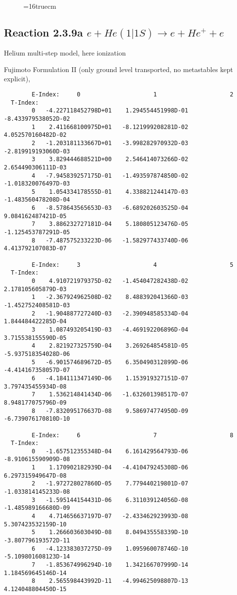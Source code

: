 \documentclass[12pt]{article}
\begin{document}
\begin{figure} \label{2.2.14}
\epsfxsize=16truecm
\end{figure}
\newpage




\subsection{
Reaction 2.3.9a  $e + He(1|1S) \rightarrow  e + He^+ + e $
}
Helium multi-step model, here ionization

 Fujimoto Formulation II (only ground level transported, no metastables
 kept explicit), \cite{kn:Fujimoto}



\begin{small}\begin{verbatim}
        E-Index:     0                     1                     2
  T-Index:
        0   -4.227118452798D+01    1.294554451998D-01   -8.433979538052D-02
        1    2.411668100975D+01   -8.121999208281D-02    4.052570160482D-02
        2   -1.203181133667D+01   -3.998282970932D-03   -2.819919193060D-03
        3    3.829444688521D+00    2.546414073266D-02    2.654490306111D-03
        4   -7.945839257175D-01   -1.493597874850D-02   -1.018320076497D-03
        5    1.054334178555D-01    4.338821244147D-03   -1.483560478208D-04
        6   -8.578643565653D-03   -6.689202603525D-04    9.084162487421D-05
        7    3.886232727181D-04    5.180805123476D-05   -1.125453787291D-05
        8   -7.487575233223D-06   -1.582977433740D-06    4.413792107083D-07

        E-Index:     3                     4                     5
  T-Index:
        0    4.910721979375D-02   -1.454047282438D-02    2.178105605879D-03
        1   -2.367924962508D-02    8.488392041366D-03   -1.452752408581D-03
        2   -1.904887727240D-03   -2.390948585334D-04    1.844484422285D-04
        3    1.087493205419D-03   -4.469192206896D-04    3.715538155590D-05
        4    2.821927325759D-04    3.269264854581D-05   -5.937518354028D-06
        5   -6.901574689672D-05    6.350490312899D-06   -4.414167358057D-07
        6   -4.184111347149D-06    1.153919327151D-07    3.797435455934D-08
        7    1.536214841434D-06   -1.632601398517D-07    8.948177075796D-09
        8   -7.832095176637D-08    9.586974774950D-09   -6.739076170810D-10

        E-Index:     6                     7                     8
  T-Index:
        0   -1.657512355348D-04    6.161429564793D-06   -8.910615590909D-08
        1    1.170902182939D-04   -4.410479245308D-06    6.297315949647D-08
        2   -1.972728027860D-05    7.779440219801D-07   -1.033814145233D-08
        3   -1.595144154431D-06    6.311039124056D-08   -1.485989166680D-09
        4    4.714656637197D-07   -2.433462923993D-08    5.307423532159D-10
        5    1.266603603049D-08    8.049435558339D-10   -3.807796193572D-11
        6   -4.123383037275D-09    1.095960078746D-10   -5.109801608123D-14
        7   -1.853674996294D-10    1.342166707999D-14    1.184569645146D-14
        8    2.565598443992D-11   -4.994625098807D-13    4.124048804450D-15


\end{verbatim}
\end{small}
\end{document}
